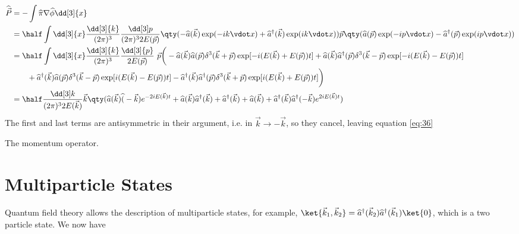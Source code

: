 \begin{bigderiv*}
  \begin{align*}
    \Op{\vec{P}} & = - \int \Op{\pi} \nabla \Op{\phi} \dd[3]{x}   \\ 
                 & = \half \int \dd[3]{x} \frac{\dd[3]{k}}{(2\pi)^3} \normmeasure{p} \qty( 
                         - \Op{a}(\vec{k}) \exp(-i k \vdot x) + \hOp{a}(\vec{k}) \exp(i k \vdot x) ) \vec{p} 
                           \qty( \Op{a}(\vec{p}) \exp(-i p \vdot x) - \hOp{a}(\vec{p}) \exp(i p \vdot x) 
                      )                                                               \\
                 & = \half \int \dd[3]{x} \frac{\dd[3]{k}}{(2\pi)^3}  \frac{\dd[3]{p}}{2 E(\vec{p})} \ \vec{p} \bigg(  
                         - \Op{a}(\vec{k}) \Op{a}(\vec{p}) \delta^3(\vec{k}+\vec{p}) \exp[ - i (E(\vec{k}) + E(\vec{p}) )t] 
                         + \Op{a}(\vec{k}) \hOp{a}(\vec{p}) \delta^3(\vec{k}-\vec{p}) \exp[ - i (E(\vec{k}) - E(\vec{p}) )t] \\
                 &\qquad + \hOp{a}(\vec{k}) \Op{a}(\vec{p}) \delta^3(\vec{k}-\vec{p}) \exp[ i (E(\vec{k}) - E(\vec{p}) )t] 
                         - \hOp{a}(\vec{k}) \hOp{a}(\vec{p}) \delta^3(\vec{k}+\vec{p}) \exp[ i (E(\vec{k}) + E(\vec{p}) )t] 
                     \bigg)  \\
                 & = \half \normmeasure{k} \vec{k}  \qty( 
                           \Op{a}(\vec{k}) \Op(-\vec{k}) e^{-2i E(\vec{k})t} 
                         + \Op{a}(\vec{k}) \hOp{a}(\vec{k}) 
                         + \hOp{a}(\vec{k}) + \Op{a}(\vec{k}) 
                         + \hOp{a}(\vec{k}) \hOp{a}(-\vec{k}) e^{2i E(\vec{k}) t} 
                      ) 
  \end{align*}
  The first and last terms are antisymmetric in their argument,
  i.e. in $\vec{k} \to - \vec{k}$, so they cancel, leaving equation
  \eqref{eq:36}
\caption{The momentum operator.}
\end{bigderiv*}

\section{Multiparticle States}
\label{sec:multiparticle-states}


Quantum field theory allows the description of multiparticle states, for example, $\ket{\vec{k}_1, \vec{k}_2} = \hOp{a}(\vec{k}_2) \hOp{a}(\vec{k}_1) \ket{0}$, which is a two particle state. We now have 

